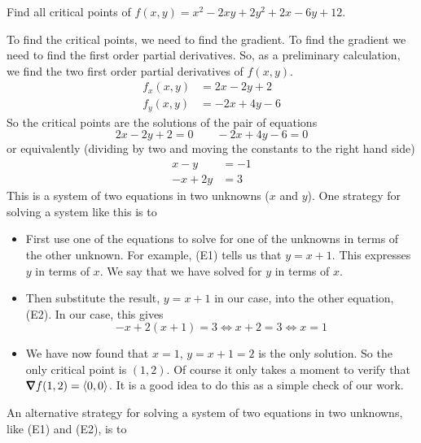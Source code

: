 \begin{eg}[$f(x,y)=x^2-2xy+2y^2+2x-6y+12$]\label{eg:MXMNlocalA}
Find all critical points of $f(x,y)=x^2-2xy+2y^2+2x-6y+12$.

\soln
To find the critical points, we need to find the gradient. To find the 
gradient we need to find the first order partial derivatives.
So, as a preliminary calculation, we find the two first order
partial derivatives of $f(x,y)$.
\begin{align*}
f_x(x,y)&= 2x-2y+2 \\
f_y(x,y)&= -2x+4y-6 
\end{align*}
So the critical points are the solutions of the pair of equations
\begin{equation*}
2x-2y+2=0\qquad -2x+4y-6=0
\end{equation*} 
or equivalently (dividing by two and moving the constants to the 
right hand side)
\begin{subequations}\label{eq:MXMNlocalA}
\begin{align*}
x-y&=-1 \tag{E1}\\
-x+2y&=3 \tag{E2}
\end{align*}
\end{subequations}
This is a system of two equations in two unknowns ($x$ and $y$).
One strategy for solving a system like this is to 
\begin{itemize}
\item First use one of the equations to solve for one of the unknowns
in terms of the other unknown. For example, (E1) tells
us that $y= x+1$. This expresses $y$ in terms of $x$. We say that we have
solved for $y$ in terms of $x$.

\item Then substitute the result, $y= x+1$ in our case, into the
other equation, (E2). In our case, this gives
\begin{equation*}
-x+2(x+1)=3
\iff x+2=3
\iff x=1
\end{equation*} 

\item We have now found that $x=1$, $y=x+1=2$ is the only solution. So
the only critical point is $(1,2)$. Of course it only takes a moment to
verify that $\vnabla f(1,2) =\llt 0,0\rgt$. It is a good idea to do this
as a simple check of our work.  

\end{itemize}
An alternative strategy for solving a system of two equations in two unknowns,
like (E1) and (E2), is to 


\end{eg}
